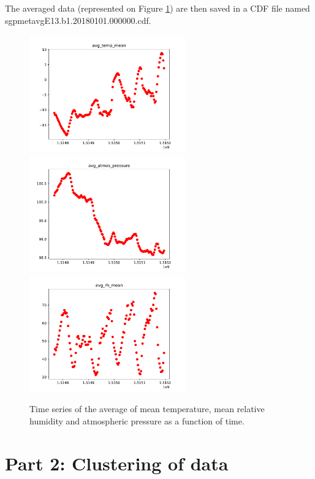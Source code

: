 \documentclass[11pt]{amsart}
\begin{document}
The averaged data (represented on Figure \ref{fig:ts-avg}) are then saved in a CDF file named sgpmetavgE13.b1.20180101.000000.cdf.
\begin{figure}
    \includegraphics[width=0.6\textwidth]{../plots/avg_temp_mean.pdf}
    \includegraphics[width=0.6\textwidth]{../plots/avg_atmos_pressure.pdf}
    \includegraphics[width=0.6\textwidth]{../plots/avg_rh_mean.pdf}
    \caption{\label{fig:ts-avg}Time series of the average of mean temperature, mean relative humidity and atmospheric pressure as a function of time.}
\end{figure}

\section{Part 2: Clustering of data}
\end{document}
